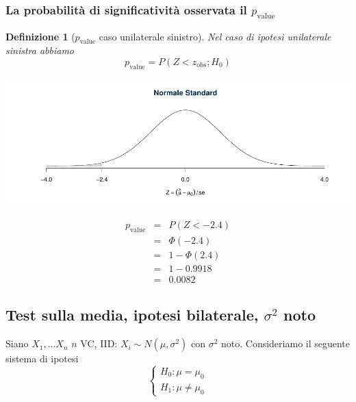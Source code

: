 \documentclass[
  11pt,
]{book}
\theoremstyle{mytheoremstyle}
\theoremstyle{mydefstyle}
\newtheorem{definition}{Definizione}[section]
\begin{document}
\subsubsection{\texorpdfstring{La probabilità di significatività osservata il \(p_\text{value}\)}{La probabilità di significatività osservata il p\_\textbackslash text\{value\}}}\label{la-probabilituxe0-di-significativituxe0-osservata-il-p_textvalue-1}

\begin{definition}[$p_\text{value}$ caso unilaterale sinistro]
Nel caso di ipotesi unilaterale sinistra abbiamo
\[p_\text{value}=P(Z<z_{\text{obs}};H_0)\]
\end{definition}

\begin{center}\includegraphics{Appunti_di_Statistica_2025_files/figure-latex/15-test-mu-pi-18-1} \end{center}

\begin{eqnarray*}
p_{\text{value}}&=& P(Z<-2.4) \\
                &=& \Phi(-2.4)\\
                &=& 1-\Phi(2.4)\\
                &=& 1-0.9918\\
                &=& 0.0082
\end{eqnarray*}

\subsection{\texorpdfstring{Test sulla media, ipotesi bilaterale, \(\sigma^2\) noto}{Test sulla media, ipotesi bilaterale, \textbackslash sigma\^{}2 noto}}\label{test-sulla-media-ipotesi-bilaterale-sigma2-noto}

Siano \(X_1,...X_n\) \(n\) VC, IID: \(X_i\sim N(\mu,\sigma^2)\) con \(\sigma^2\)
noto. Consideriamo il seguente sistema di ipotesi \[\begin{cases}
H_0:\mu=\mu_0\\
H_1:\mu\neq\mu_0
\end{cases}\]
\end{document}
